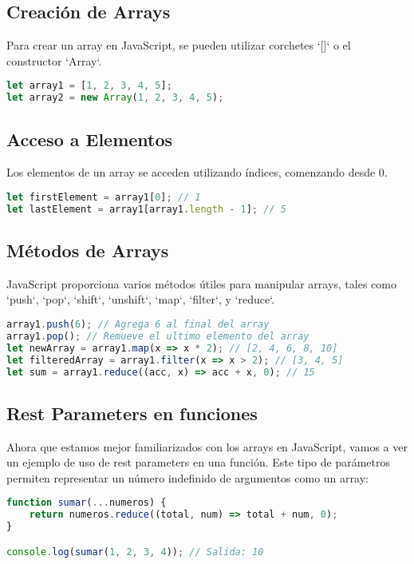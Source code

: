 \documentclass{book}
\begin{document}
\subsection{Creación de Arrays}
Para crear un array en JavaScript, se pueden utilizar corchetes `[]` o el constructor `Array`.

\begin{lstlisting}[language=JavaScript]
let array1 = [1, 2, 3, 4, 5];
let array2 = new Array(1, 2, 3, 4, 5);
\end{lstlisting}

\subsection{Acceso a Elementos}
Los elementos de un array se acceden utilizando índices, comenzando desde 0.

\begin{lstlisting}[language=JavaScript]
let firstElement = array1[0]; // 1
let lastElement = array1[array1.length - 1]; // 5
\end{lstlisting}

\subsection{Métodos de Arrays}
JavaScript proporciona varios métodos útiles para manipular arrays, tales como `push`, `pop`, `shift`, `unshift`, `map`, `filter`, y `reduce`.

\begin{lstlisting}[language=JavaScript]
array1.push(6); // Agrega 6 al final del array
array1.pop(); // Remueve el ultimo elemento del array
let newArray = array1.map(x => x * 2); // [2, 4, 6, 8, 10]
let filteredArray = array1.filter(x => x > 2); // [3, 4, 5]
let sum = array1.reduce((acc, x) => acc + x, 0); // 15
\end{lstlisting}

\subsection{Rest Parameters en funciones}
Ahora que estamos mejor familiarizados con los arrays en JavaScript, vamos a ver un ejemplo de uso de rest parameters en una función.
Este tipo de parámetros permiten representar un número indefinido de argumentos como un array:

\begin{lstlisting}[language=JavaScript]
function sumar(...numeros) {
    return numeros.reduce((total, num) => total + num, 0);
}

console.log(sumar(1, 2, 3, 4)); // Salida: 10
\end{lstlisting}
\end{document}
